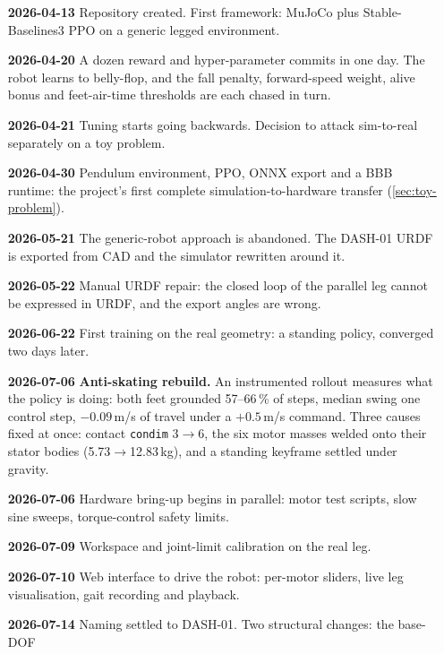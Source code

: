 \begin{itemize}[leftmargin=1.2cm,label={}]
  \item[\textbf{2026-04-13}] Repository created. First framework: MuJoCo plus Stable-Baselines3 PPO
        on a generic legged environment.
  \item[\textbf{2026-04-20}] A dozen reward and hyper-parameter commits in one day. The robot
        learns to belly-flop, and the fall penalty, forward-speed weight, alive bonus and
        feet-air-time thresholds are each chased in turn.
  \item[\textbf{2026-04-21}] Tuning starts going backwards. Decision to attack sim-to-real
        separately on a toy problem.
  \item[\textbf{2026-04-30}] Pendulum environment, PPO, ONNX export and a BBB runtime:
        the project's first complete simulation-to-hardware transfer (\cref{sec:toy-problem}).
  \item[\textbf{2026-05-21}] The generic-robot approach is abandoned. The DASH-01 URDF is exported
        from CAD and the simulator rewritten around it.
  \item[\textbf{2026-05-22}] Manual URDF repair: the closed loop of the parallel leg cannot be
        expressed in URDF, and the export angles are wrong.
  \item[\textbf{2026-06-22}] First training on the real geometry: a standing policy, converged two
        days later.
  \item[\textbf{2026-07-06}] \textbf{Anti-skating rebuild.} An instrumented rollout measures what
        the policy is doing: both feet grounded 57--66\,\% of steps, median swing one control step,
        $-0.09$\,m/s of travel under a $+0.5$\,m/s command. Three causes fixed at once: contact
        \texttt{condim} 3$\to$6, the six motor masses welded onto their stator bodies
        (5.73$\to$12.83\,kg), and a standing keyframe settled under gravity.
  \item[\textbf{2026-07-06}] Hardware bring-up begins in parallel: motor test scripts, slow sine
        sweeps, torque-control safety limits.
  \item[\textbf{2026-07-09}] Workspace and joint-limit calibration on the real leg.
  \item[\textbf{2026-07-10}] Web interface to drive the robot: per-motor sliders, live leg
        visualisation, gait recording and playback.
  \item[\textbf{2026-07-14}] Naming settled to DASH-01. Two structural changes: the base-DOF

\end{itemize}
